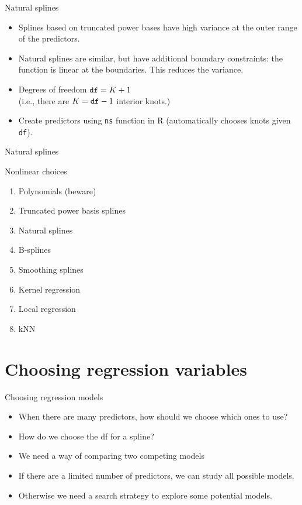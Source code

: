 \documentclass[14pt]{beamer}
\makeatletter
\def\biz{\begin{itemize}[<+-| alert@+>]}
\def\eiz{\end{itemize}}
\makeatother
\begin{document}
\begin{frame}[fragile]{Natural splines}

\begin{itemize}
\item 
Splines based on truncated power bases have high variance at the outer range of the predictors.
\item Natural splines are similar, but have additional \alert{boundary constraints}: the function is linear at the boundaries. This reduces the variance.

\item Degrees of freedom $\verb|df|=K+1$\\ (i.e., there are $K=\verb|df|-1$ interior knots.)

\item Create predictors using \verb|ns| function in R (automatically chooses knots given \verb|df|).


\end{itemize}

\end{frame}

\begin{frame}{Natural splines}

\end{frame}

\begin{frame}{Nonlinear choices}
\begin{enumerate}
\item Polynomials (beware)
\item Truncated power basis splines
\item Natural splines
\item B-splines
\item Smoothing splines
\item Kernel regression
\item Local regression
\item kNN
\end{enumerate}
\end{frame}

\section{Choosing regression variables}

\begin{frame}{Choosing regression models}
\biz
\item When there are many predictors, how should we choose which ones to use?

\item How do we choose the df for a spline?

\item We need a way of comparing two competing models

\item If there are a limited number of predictors, we can study all possible models.

\item Otherwise we need a search strategy to explore some potential models.
\eiz

\end{frame}
\end{document}
